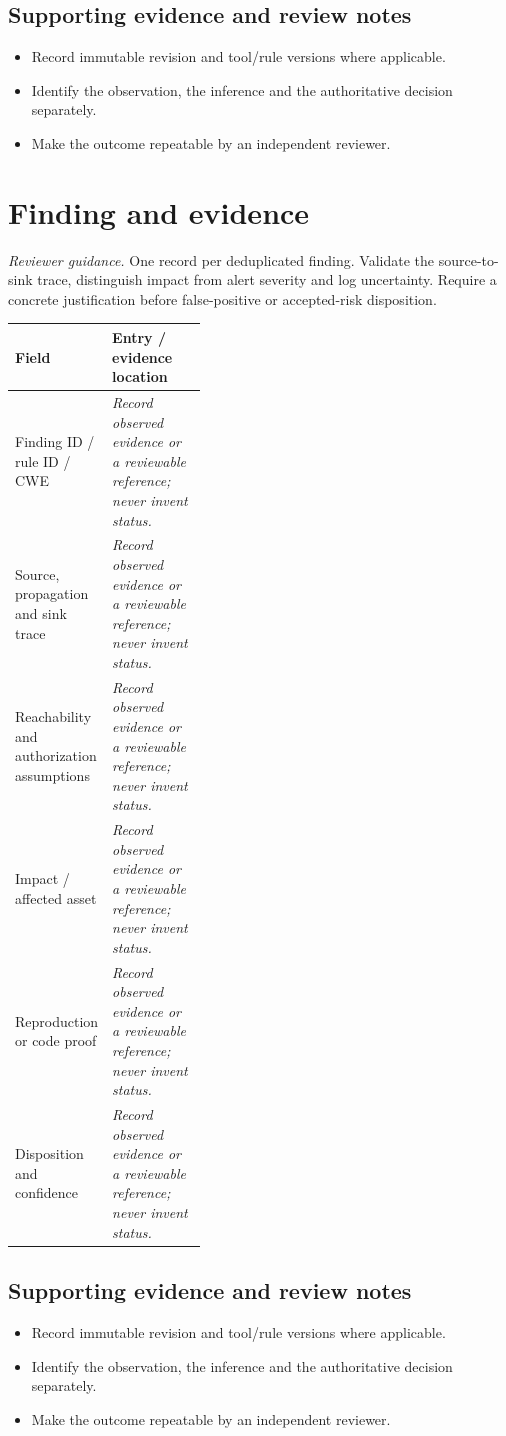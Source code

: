 \documentclass[10pt,letterpaper]{article}
\begin{document}
\subsection{Supporting evidence and review notes}
\begin{itemize}
\item Record immutable revision and tool/rule versions where applicable.
\item Identify the observation, the inference and the authoritative decision separately.
\item Make the outcome repeatable by an independent reviewer.
\end{itemize}
\clearpage
\section{Finding and evidence}
\textit{Reviewer guidance.} One record per deduplicated finding. Validate the source-to-sink trace, distinguish impact from alert severity and log uncertainty. Require a concrete justification before false-positive or accepted-risk disposition.
\begin{tabularx}{\linewidth}{@{}p{0.38\linewidth}Y@{}}
\toprule Field & Entry / evidence location\\\midrule
Finding ID / rule ID / CWE & \textit{Record observed evidence or a reviewable reference; never invent status.}\\[1.0em]
\midrule
Source, propagation and sink trace & \textit{Record observed evidence or a reviewable reference; never invent status.}\\[1.0em]
\midrule
Reachability and authorization assumptions & \textit{Record observed evidence or a reviewable reference; never invent status.}\\[1.0em]
\midrule
Impact / affected asset & \textit{Record observed evidence or a reviewable reference; never invent status.}\\[1.0em]
\midrule
Reproduction or code proof & \textit{Record observed evidence or a reviewable reference; never invent status.}\\[1.0em]
\midrule
Disposition and confidence & \textit{Record observed evidence or a reviewable reference; never invent status.}\\[1.0em]
\midrule
\end{tabularx}
\subsection{Supporting evidence and review notes}
\begin{itemize}
\item Record immutable revision and tool/rule versions where applicable.
\item Identify the observation, the inference and the authoritative decision separately.
\item Make the outcome repeatable by an independent reviewer.
\end{itemize}
\clearpage
\end{document}
